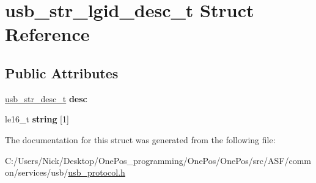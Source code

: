 \hypertarget{structusb__str__lgid__desc__t}{\section{usb\-\_\-str\-\_\-lgid\-\_\-desc\-\_\-t Struct Reference}
\label{structusb__str__lgid__desc__t}
}
\subsection*{Public Attributes}
\begin{DoxyCompactItemize}
\item 
\hypertarget{structusb__str__lgid__desc__t_a9b1b4bea90e7ac4aac264d3a5b39a8d6}{\hyperlink{structusb__str__desc__t}{usb\-\_\-str\-\_\-desc\-\_\-t} {\bfseries desc}}\label{structusb__str__lgid__desc__t_a9b1b4bea90e7ac4aac264d3a5b39a8d6}

\item 
\hypertarget{structusb__str__lgid__desc__t_aeb9b6d37605e7a462e91ae345132f371}{le16\-\_\-t {\bfseries string} \mbox{[}1\mbox{]}}\label{structusb__str__lgid__desc__t_aeb9b6d37605e7a462e91ae345132f371}

\end{DoxyCompactItemize}


The documentation for this struct was generated from the following file\-:\begin{DoxyCompactItemize}
\item 
C\-:/\-Users/\-Nick/\-Desktop/\-One\-Pos\-\_\-programming/\-One\-Pos/\-One\-Pos/src/\-A\-S\-F/common/services/usb/\hyperlink{usb__protocol_8h}{usb\-\_\-protocol.\-h}\end{DoxyCompactItemize}
